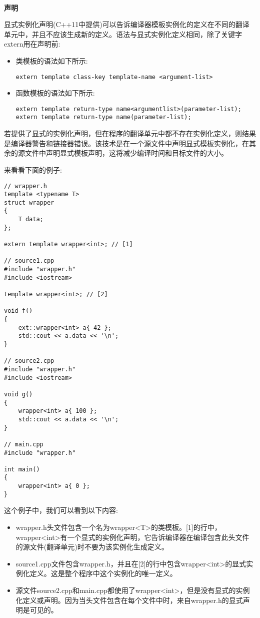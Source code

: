 \hspace*{\fill} \\ %
\noindent\textbf{声明}

显式实例化声明(C++11中提供)可以告诉编译器模板实例化的定义在不同的翻译单元中，并且不应该生成新的定义。语法与显式实例化定义相同，除了关键字extern用在声明前:

\begin{itemize}
\item 
类模板的语法如下所示:
\begin{lstlisting}[style=styleCXX]
extern template class-key template-name <argument-list>
\end{lstlisting}

\item 
函数模板的语法如下所示:
\begin{lstlisting}[style=styleCXX]
extern template return-type name<argumentlist>(parameter-list);
extern template return-type name(parameter-list);
\end{lstlisting}
\end{itemize}

若提供了显式的实例化声明，但在程序的翻译单元中都不存在实例化定义，则结果是编译器警告和链接器错误。该技术是在一个源文件中声明显式模板实例化，在其余的源文件中声明显式模板声明，这将减少编译时间和目标文件的大小。

来看看下面的例子:

\begin{lstlisting}[style=styleCXX]
// wrapper.h
template <typename T>
struct wrapper
{
	T data;
};

extern template wrapper<int>; // [1]

// source1.cpp
#include "wrapper.h"
#include <iostream>

template wrapper<int>; // [2]

void f()
{
	ext::wrapper<int> a{ 42 };
	std::cout << a.data << '\n';
}

// source2.cpp
#include "wrapper.h"
#include <iostream>

void g()
{
	wrapper<int> a{ 100 };
	std::cout << a.data << '\n';
}

// main.cpp
#include "wrapper.h"

int main()
{
	wrapper<int> a{ 0 };
}
\end{lstlisting}

这个例子中，我们可以看到以下内容:

\begin{itemize}
\item 
wrapper.h头文件包含一个名为wrapper<T>的类模板。[1]的行中，wrapper<int>有一个显式的实例化声明，它告诉编译器在编译包含此头文件的源文件(翻译单元)时不要为该实例化生成定义。

\item 
source1.cpp文件包含wrapper.h，并且在[2]的行中包含wrapper<int>的显式实例化定义。这是整个程序中这个实例化的唯一定义。

\item 
源文件source2.cpp和main.cpp都使用了wrapper<int>，但是没有显式的实例化定义或声明。因为当头文件包含在每个文件中时，来自wrapper.h的显式声明是可见的。
\end{itemize}

